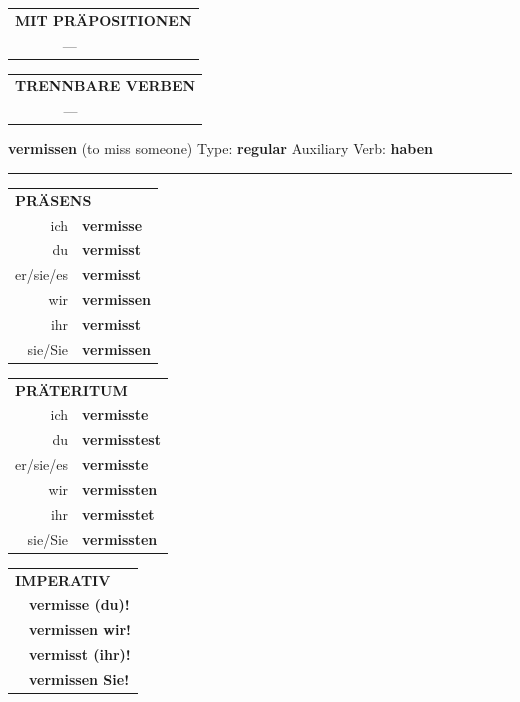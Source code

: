 \documentclass[10pt,a4paper]{revtex4-2}
\begin{document}
\begin{verbbox}
\vspace{10pt}

\begin{tabular}{lll}
\multicolumn{3}{l}{\textbf{MIT PRÄPOSITIONEN}}\\
& --- & \\
\end{tabular}
\hfill
\begin{tabular}{lll}
\multicolumn{3}{l}{\textbf{TRENNBARE VERBEN}}\\
& --- &\\
\end{tabular}
\vspace{-5pt}
\end{verbbox}

\begin{verbbox}
{\Large \bf vermissen} (to miss someone) \hfill Type: \textbf{regular} \hfill Auxiliary Verb: \textbf{haben}

\vspace{5pt}
\hrule
\vspace{5pt}

\begin{tabular}{rl}
\multicolumn{2}{l}{\textbf{PRÄSENS}}\\
ich & \textbf{vermisse}\\
du & \textbf{vermisst}\\
er/sie/es & \textbf{vermisst}\\
wir & \textbf{vermissen}\\
ihr & \textbf{vermisst}\\
sie/Sie & \textbf{vermissen}\\
\end{tabular}
\hfill
\begin{tabular}{rl}
\multicolumn{2}{l}{\textbf{PRÄTERITUM}}\\
ich & \textbf{vermisste}\\
du & \textbf{vermisstest}\\
er/sie/es & \textbf{vermisste}\\
wir & \textbf{vermissten}\\
ihr & \textbf{vermisstet}\\
sie/Sie & \textbf{vermissten}\\
\end{tabular}
\hfill
\begin{tabular}{rl}
\multicolumn{2}{l}{\textbf{IMPERATIV}}\\
& \textbf{vermisse (du)!}\\
& \textbf{vermissen wir!}\\
& \textbf{vermisst (ihr)!}\\
& \textbf{vermissen Sie!}\\
\end{tabular}


\end{verbbox}
\end{document}
